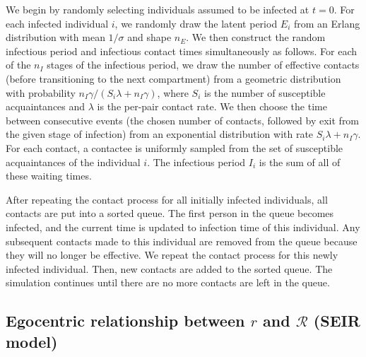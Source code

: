 \documentclass[12pt]{article}
\newcommand{\RR}{\ensuremath{{\mathcal R}}}
\begin{document}
We begin by randomly selecting individuals assumed to be infected at $t = 0$.
For each infected individual $i$, we randomly draw the latent period $E_i$ from an Erlang distribution with mean $1/\sigma$ and shape $n_E$.
We then construct the random infectious period and infectious contact times simultaneously as follows.
For each of the $n_I$ stages of the infectious period, we draw the number of effective contacts (before transitioning to the next compartment) from a geometric distribution with probability $n_I\gamma/(S_i \lambda + n_I \gamma)$, where $S_i$ is the number of susceptible acquaintances and $\lambda$ is the per-pair contact rate.
We then choose the time between consecutive events (the chosen number of contacts, followed by exit from the given stage of infection) from an exponential distribution with rate $S_i \lambda + n_I\gamma$.
For each contact, a contactee is uniformly sampled from the set of susceptible acquaintances of the individual $i$.
The infectious period $I_i$ is the sum of all of these waiting times.

After repeating the contact process for all initially infected individuals, all contacts are put into a sorted queue.
The first person in the queue becomes infected, and the current time is updated to infection time of this individual. 
Any subsequent contacts made to this individual are removed from the queue because they will no longer be effective.
We repeat the contact process for this newly infected individual.
Then, new contacts are added to the sorted queue.
The simulation continues until there are no more contacts are left in the queue.

\subsection{Egocentric relationship between $r$ and $\RR$ (SEIR model)}
\label{egosection}
\end{document}
